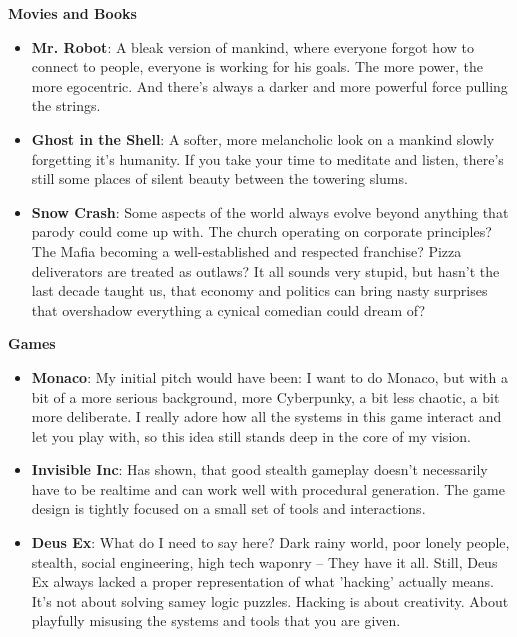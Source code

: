 \documentclass[11pt,a4paper, twocolumn]{article}
\begin{document}
\textbf{Movies and Books}

\begin{itemize}
    \item \textbf{Mr. Robot}: A bleak version of mankind, where everyone forgot how to connect to people,
            everyone is working for his goals. The more power, the more egocentric. And there's
            always a darker and more powerful force pulling the strings.
    \item \textbf{Ghost in the Shell}: A softer, more melancholic look on a mankind slowly forgetting it's
            humanity. If you take your time to meditate and listen, there's still some places of silent
            beauty between the towering slums.
    \item \textbf{Snow Crash}: Some aspects of the world always evolve beyond anything that parody could come
            up with. The church operating on corporate principles? The Mafia becoming a
            well-established and respected franchise? Pizza deliverators are treated as outlaws?
            It all sounds very stupid, but hasn't the last decade taught us, that economy and politics
            can bring nasty surprises that overshadow everything a cynical comedian could dream of?
\end{itemize}

\textbf{Games}

\begin{itemize}
    \item \textbf{Monaco}: My initial pitch would have been: I want to do Monaco, but with a bit of a more serious
                background, more Cyberpunky, a bit less chaotic, a bit more deliberate. I really adore how all
                the systems in this game interact and let you play with, so this idea still stands deep in the
                core of my vision.
    \item \textbf{Invisible Inc}: Has shown, that good stealth gameplay doesn't necessarily have to be realtime
                and can work well with procedural generation. The game design is tightly focused on a small set
                of tools and interactions.
    \item \textbf{Deus Ex}: What do I need to say here? Dark rainy world, poor lonely people, stealth,
                social engineering, high tech waponry -- They have it all. Still, Deus Ex always lacked a proper representation of
                what 'hacking' actually means. It's not about solving samey logic puzzles. Hacking is about creativity.
                About playfully misusing the systems and tools that you are given.
\end{itemize}
\end{document}
